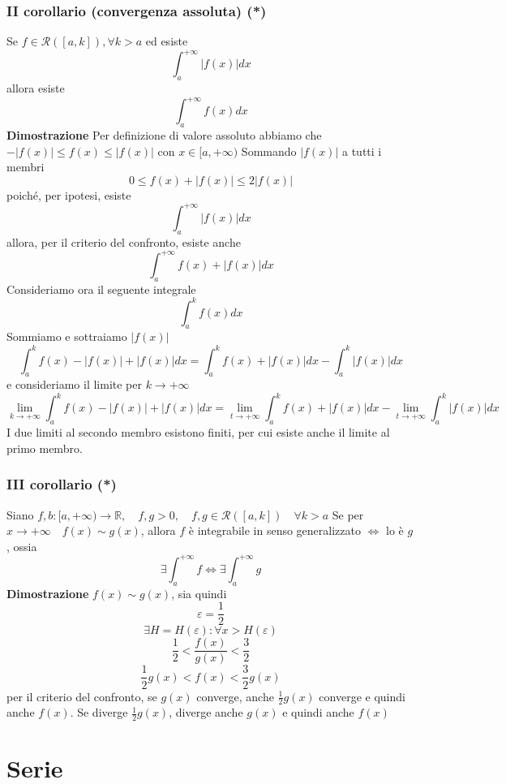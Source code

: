 \documentclass[12pt]{article}
\begin{document}
\subsubsection{II corollario (convergenza assoluta) (*)}
Se $f \in \mathscr{R}([a,k]), \forall k > a$ ed esiste
\[ \int_a^{+\infty}|f(x)|dx \]
allora esiste
\[ \int_a^{+\infty}f(x)dx \]
\textbf{Dimostrazione}\newline
Per definizione di valore assoluto abbiamo che $-|f(x)|\leq f(x) \leq |f(x)|$ con $x\in [a, +\infty)$\newline
Sommando $|f(x)|$ a tutti i membri
\[ 0\leq f(x) + |f(x)| \leq 2|f(x)| \]
poiché, per ipotesi, esiste
\[ \int_{a}^{+\infty} |f(x)| dx\]
 allora, per il criterio del confronto, esiste anche 
\[ \int_{a}^{+\infty} f(x) + |f(x)| dx \]
Consideriamo ora il seguente integrale
\[ \int_{a}^{k} f(x) dx \]
Sommiamo e sottraiamo $|f(x)|$
\[ \int_{a}^{k} f(x) - |f(x)| + |f(x)| dx = \int_{a}^{k} f(x) + |f(x)| dx - \int_{a}^{k} |f(x)| dx\]
e consideriamo il limite per $k \to +\infty$
\[ \lim_{k \to +\infty} \int_{a}^{k} f(x) - |f(x)| + |f(x)| dx = \lim_{t \to +\infty} \int_{a}^{k} f(x) + |f(x)| dx - \lim_{t \to +\infty} \int_{a}^{k} |f(x)| dx\]
I due limiti al secondo membro esistono finiti, per cui esiste anche il limite al primo membro.

\subsubsection{III corollario (*)}
Siano  $f,b : [a, +\infty) \to \mathbb{R}, \quad f,g>0, \quad f,g \in \mathscr{R}([a,k]) \quad \forall k>a$\newline
Se per $x \to +\infty \quad f(x) \sim g(x)$, allora\newline
$f$ è integrabile in senso generalizzato $\Leftrightarrow$ lo è $g$, ossia
\[ \exists \int_a^{+\infty} f \Leftrightarrow \exists \int_a^{+\infty} g\]
\textbf{Dimostrazione}\newline
$f(x)\sim g(x)$, sia quindi
\[ \varepsilon = \frac{1}{2}\]
\[ \exists H = H(\varepsilon) : \forall x > H(\varepsilon) \]
\[ \frac{1}{2} < \frac{f(x)}{g(x)} < \frac{3}{2} \]
\[ \frac{1}{2} g(x) < f(x) < \frac{3}{2} g(x)\]
per il criterio del confronto, se $g(x)$ converge, anche $\frac{1}{2} g(x)$ converge e quindi anche $f(x)$. Se diverge $\frac{1}{2}g(x)$, diverge anche $g(x)$ e quindi anche $f(x)$

\section{Serie}
\end{document}
